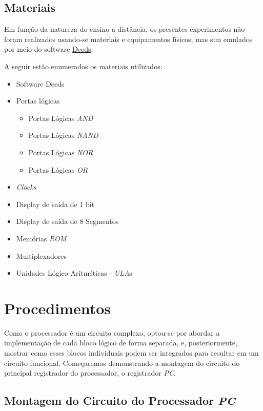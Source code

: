 \documentclass[12pt]{article}
\begin{document}
\subsection{Materiais}\label{sec:Materiais}

Em função da natureza do ensino a distância, os presentes experimentos não foram
realizados usando-se materiais e equipamentos físicos, mas sim emulados por meio
do software
\href{https://www.digitalelectronicsdeeds.com/downloads.html}{Deeds}.

A seguir estão enumerados os materiais utilizados:
\begin{itemize}
    \item Software Deeds
    \item Portas lógicas
    \begin{itemize}
      \item Portas Lógicas \emph{AND}
      \item Portas Lógicas \emph{NAND}
      \item Portas Lógicas \emph{NOR}
      \item Portas Lógicas \emph{OR}
    \end{itemize}
    \item \emph{Clocks}
    \item Display de saída de 1 bit
    \item Display de saída de 8 Segmentos
    \item Memórias \emph{ROM}
    \item Multiplexadores
    \item Unidades Lógico-Aritméticas - \emph{ULA}s
\end{itemize}

\section{Procedimentos}\label{sec:Procedimentos}

Como o processador é um circuito complexo, optou-se por abordar a implementação
de cada bloco lógico de forma separada, e, posteriormente, mostrar como esses
blocos individuais podem ser integrados para resultar em um circuito funcional.
Começaremos demonstrando a montagem do circuito do principal registrador do
processador, o registrador \emph{PC}.

\subsection{Montagem do Circuito do Processador \emph{PC}}\label{sec:2.1}
\end{document}
